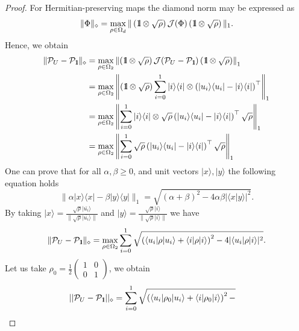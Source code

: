 \documentclass[preprint,12pt, a4paper]{elsarticle}
\newcommand{\ket}[1]{\ensuremath{|#1\rangle}}
\newcommand{\bra}[1]{\ensuremath{\langle#1|}}
\newcommand{\ketbra}[2]{\ensuremath{\ket{#1}\bra{#2}}}
\newcommand{\proj}[1]{\ensuremath{\ketbra{#1}{#1}}}
\newcommand{\braket}[2]{\ensuremath{\langle{#1}|{#2}\rangle}}
\newcommand{\1}{{\rm 1\hspace{-0.9mm}l}}
\newcommand{\Id}{{\rm 1\hspace{-0.9mm}l}}
\newcommand{\PP}{\mathcal{P}}
\begin{document}
\begin{proof}
For Hermitian-preserving maps \cite{watrous} the diamond norm may be expressed as
\begin{equation}
\| \Phi  \|_\diamond =  \max_{\rho \in \Omega_d} \| \left( \Id \otimes \sqrt{\rho} \right) \mathcal{J}(\Phi)  \left( \Id \otimes \sqrt{\rho} \right)  \|_1.  \end{equation}
Hence, we obtain
\begin{equation}
\begin{split}
\| \PP_{U} - \PP_{\Id}  \|_\diamond 
& =  \max_{\rho \in \Omega_2} \left\| \left( \Id \otimes \sqrt{\rho} \right) 
\mathcal{J}(\PP_{U} - \PP_{\Id} )  \left( \Id \otimes \sqrt{\rho} \right)  \right\|_1   
\\ 
& =  \max_{\rho \in \Omega_2} \left\| \left( \Id \otimes \sqrt{\rho} \right) 
\sum_{i=0}^{1} \proj{i} \otimes \left( \proj{u_i} - \proj{i} \right)^\top  
\right\|_1  \\ 
& = \max_{\rho \in \Omega_2} \left\| \sum_{i=0}^{1} \proj{i} \otimes 
\sqrt{\rho}  \left( \proj{u_i} - \proj{i} \right)^\top \sqrt{\rho}  \right\|_1  
\\ 
& = \max_{\rho \in \Omega_2} \left\| \sum_{i=0}^{1}\sqrt{\rho}  \left( 
\proj{u_i} - \proj{i} \right)^\top \sqrt{\rho}  \right\|_1
\end{split}
\end{equation}
One can prove that for all $\alpha, \beta \ge 0 $, and unit vectors $\ket{x}, 
\ket{y}$ the following equation holds~\cite{watrous} 
\begin{equation}
\| \alpha \proj{x} - \beta\proj{y} \|_1 = \sqrt{(\alpha + \beta)^2 - 4\alpha 
\beta |\braket{x}{y}|^2}.
\end{equation}
By taking $\ket{x} = \frac{\sqrt{\rho} \ket{\bar{u_i}}}{\| \sqrt{\rho} 
\ket{\bar{u_i}} \|}$ and $ \ket{y} = \frac{\sqrt{\rho} \ket{i}}{\|\sqrt{\rho} 
\ket{i} \|}$ we have
\begin{equation}
	\| \PP_{U} - \PP_{\Id}  \|_\diamond  = \max_{\rho \in \Omega_2} 
	\sum_{i=0}^{1} \sqrt{\left( \bra{u_i} \rho \ket{u_i} + \bra{i} \rho \ket{i 
	}\right)^2 - 4 | \bra{u_i} \rho \ket{i} |^2}.
\end{equation}
Let us take  $\rho_0 =   \frac{1}{2}  	
\left(\begin{array}{cc}1&0\\0&1\end{array}\right)  $,   we obtain
\begin{equation}
\begin{split}
||\mathcal{P}_U - \mathcal{P}_{\1}||_\diamond 
&= \sum_{i=0}^1  
\sqrt{\left(\bra{u_i}\rho_0\ket{u_i} + \bra{i} \rho_0 \ket{i} \right)^2 - 
}
\end{split}
\end{equation}
\end{proof}
\end{document}
